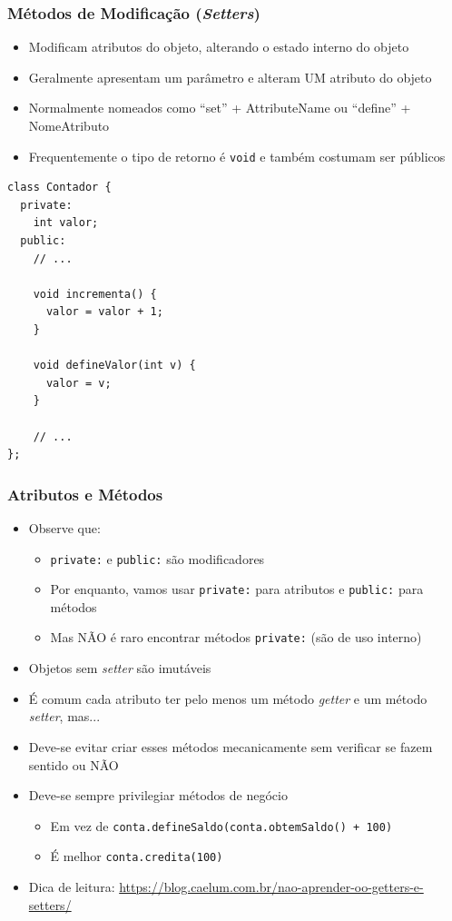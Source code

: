 \documentclass[aspectratio=169]{beamer}
\begin{document}
\begin{frame}[fragile]\frametitle{Métodos de Modificação (\emph{Setters})}
\begin{itemize}
	\item Modificam atributos do objeto, alterando o estado interno do objeto
	\item Geralmente apresentam um parâmetro e alteram UM atributo do objeto
	\item Normalmente nomeados como ``set'' + AttributeName ou ``define'' + NomeAtributo
	\item Frequentemente o tipo de retorno é \texttt{void} e também costumam ser públicos
\end{itemize}
\begin{lstlisting}[basicstyle=\ttfamily\tiny]
class Contador {
  private:
    int valor;
  public:
    // ...

    void incrementa() {
      valor = valor + 1;
    }

    void defineValor(int v) {
      valor = v;
    }

    // ...
};
\end{lstlisting}
\end{frame}

\begin{frame}\frametitle{Atributos e Métodos}
\begin{itemize}
	\item Observe que:
	\begin{itemize}
		\item \texttt{private:} e \texttt{public:} são modificadores
		\item Por enquanto, vamos usar \texttt{private:} para atributos e \texttt{public:} para métodos
		\item Mas NÃO é raro encontrar métodos \texttt{private:} (são de uso interno)
	\end{itemize}
	\item Objetos sem \emph{setter} são imutáveis
	\item É comum cada atributo ter pelo menos um método \emph{getter} e um método \emph{setter}, mas...
	\item Deve-se evitar criar esses métodos mecanicamente sem verificar se fazem sentido ou NÃO
	\item Deve-se sempre privilegiar métodos de negócio
	\begin{itemize}
		\item Em vez de \texttt{conta.defineSaldo(conta.obtemSaldo() + 100)}
		\item É melhor \texttt{conta.credita(100)}
	\end{itemize}
	\item Dica de leitura: \url{https://blog.caelum.com.br/nao-aprender-oo-getters-e-setters/}
\end{itemize}
\end{frame}
\end{document}
